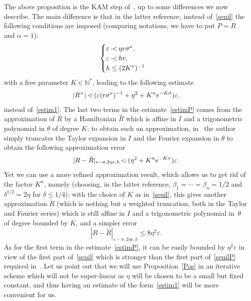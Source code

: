 \documentclass[JEP,XML,SOM,Unicode]{cedram}
\numberwithin{equation}{section}
\theoremstyle{plain}
\theoremstyle{definition}
\newcommand{\N}{\mathbb{N}}
\newcommand\MP{\,{<\hspace{-.5em}\cdot}\,}
\newcommand\PM{\,{\cdot\hspace{-.3em}<}\,}
\begin{document}
The above proposition is the KAM step of~\cite{Pos01}, up to some differences we now describe. The main difference is that in the latter reference, instead of~\eqref{seuil} the following conditions are imposed (comparing notations, we have to put $P=R$ and $\alpha=1$):
\begin{equation}\label{seuilP}
\begin{cases}
\varepsilon \PM \eta r \sigma^{\nu}, \\
\varepsilon \PM h r, \\
h \leq (2K^{\nu})^{-1}
\end{cases}
\end{equation}
with a free parameter $K \in \N^*$, leading to the following estimate
\begin{equation}\label{estimP}
|R^+| \MP (\varepsilon(r\sigma^\nu)^{-1}+\eta^2+K^ne^{-K\sigma})\varepsilon.
\end{equation}
instead of~\eqref{estim1}. The last two terms in the estimate~\eqref{estimP} comes from the approximation of $R$ by a Hamiltonian $\hat{R}$ which is affine in $I$ and a trigonometric polynomial in $\theta$ of degree $K$; to obtain such an approximation, in~\cite{Pos01} the author simply truncates the Taylor expansion in $I$ and the Fourier expansion in $\theta$ to obtain the following approximation error
\[ |R-\hat{R}|_{s-\sigma,2\eta r, h} \MP (\eta^2+K^ne^{-K\sigma})\varepsilon. \]
Yet we can use a more refined approximation result, which allows us to get rid of the factor $K^n$, namely \cite[Th.\,7.2]{Rus01} (choosing, in the latter reference, $\beta_1=\cdots=\beta_n=1/2$ and $\delta^{1/2}=2\eta$ for $\delta \leq 1/4$); with the choice of $K$ as in~\eqref{seuil}, this gives another approximation $\tilde{R}$ (which is nothing but a weighted truncation, both in the Taylor and Fourier series) which is still affine in $I$ and a trigonometric polynomial in~$\theta$ of degree bounded by $K$, and a simpler error
\[ |R-\tilde{R}|_{s-\sigma,2\eta r, h} \leq 8\eta^2\varepsilon. \]
As for the first term in the estimate~\eqref{estimP}, it can be easily bounded by $\eta^2\varepsilon$ in view of the first part of~\eqref{seuil} which is stronger than the first part of~\eqref{seuilP} required in~\cite{Pos01}. Let us point out that we will use Proposition~\ref{Pos} in an iterative scheme which will not be super-linear as $\eta$ will be chosen to be a small but fixed constant, and thus having an estimate of the form~\eqref{estim1} will be more convenient for us.
\end{document}
